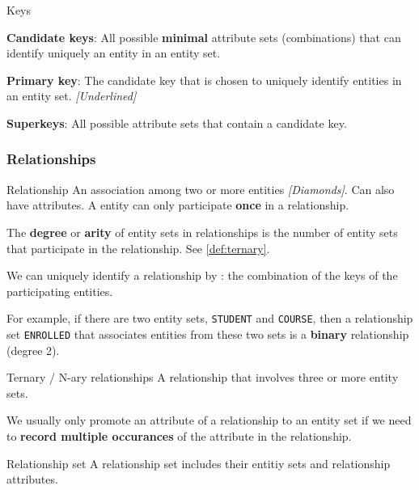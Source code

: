 \begin{definition}
    {Keys}

    \textbf{Candidate keys}: All possible \textbf{minimal} attribute sets (combinations) that can identify uniquely an entity in an entity set.

    \textbf{Primary key}: The candidate key that is chosen to uniquely identify entities in an entity set. \textit{[Underlined]}

    \textbf{Superkeys}: All possible attribute sets that contain a candidate key.
\end{definition}

\subsubsection{Relationships}

\begin{theorem}
    {Relationship}
    An association among two or more entities \textit{[Diamonds]}. Can also have attributes. A entity can only participate \textbf{once} in a relationship.

    The \textbf{degree} or \textbf{arity} of entity sets in relationships is the number of entity sets that participate in the relationship. See \ref{def:ternary}.

    We can uniquely identify a relationship by : the combination of the keys of the participating entities.

    \tcblower

    For example, if there are two entity sets, \texttt{STUDENT} and \texttt{COURSE}, then a relationship set \texttt{ENROLLED} that associates entities from these two sets is a \textbf{binary} relationship (degree 2).
\end{theorem}

\begin{theorem}
    {Ternary / N-ary relationships}
    A relationship that involves three or more entity sets.

    We usually only promote an attribute of a relationship to an entity set if we need to \textbf{record multiple occurances} of the attribute in the relationship.
    \label{def:ternary}
\end{theorem}

\begin{knBox}
    {Relationship set}
    A relationship set includes their entitiy sets and relationship attributes.
\end{knBox}

